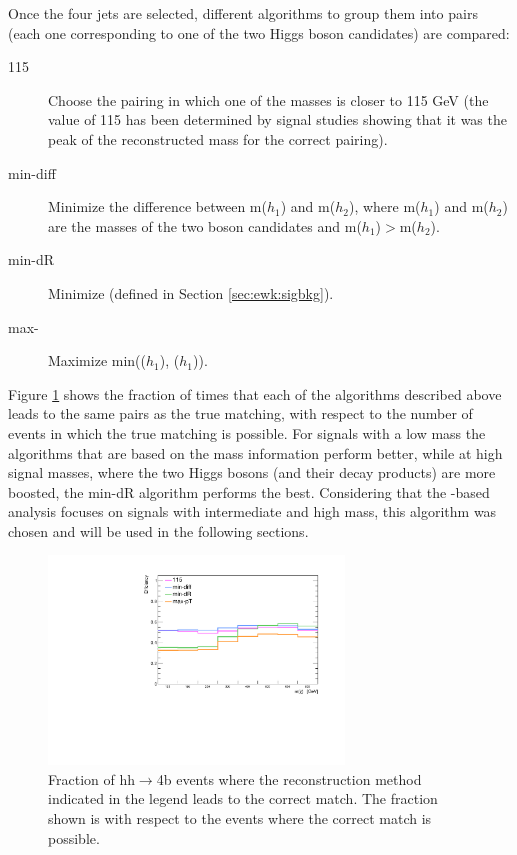 Once the four jets are selected, 
different algorithms to group them into pairs (each one corresponding to one of the two Higgs boson candidates) 
are compared: 

\begin{description}
\item[115] Choose the pairing in which one of the masses is closer to 115 GeV (the value of 115 has been determined by signal studies showing that it was the peak of the reconstructed mass for the correct pairing).
\item[min-diff] Minimize the difference between m($h_1$)  and m($h_2$), where m($h_1$) and m($h_2$) are the masses of the two boson candidates and 
m($h_1$)$>$m($h_2$).
\item[min-dR] Minimize \dRmax (defined in Section \ref{sec:ewk:sigbkg}).
\item[max-\pt] Maximize min(\pt($h_1$), \pt($h_1$)).
\end{description}


Figure \ref{fig:h_reco_best_match} shows the fraction of times that each of the algorithms 
described above leads to the same pairs as the true matching, with respect to the number of events in which the true matching is possible. 
For signals with a low mass the algorithms that are based on the mass information perform better, 
while at high signal masses, where the two Higgs bosons (and their decay products) are more boosted, 
the min-dR algorithm performs the best. 
Considering that the \met-based analysis focuses on signals with intermediate and high mass, 
this algorithm was chosen and will be used in the following sections.

\begin{figure}[h]
\centering
\includegraphics[width=0.7\textwidth]{figures/h_reco/best_match_if_match_possible.pdf}
\caption{Fraction of hh$\to$4b events where the reconstruction method indicated in the legend leads to the correct match. The fraction shown is with respect to the events where the correct match is possible.}
\label{fig:h_reco_best_match}
\end{figure}

